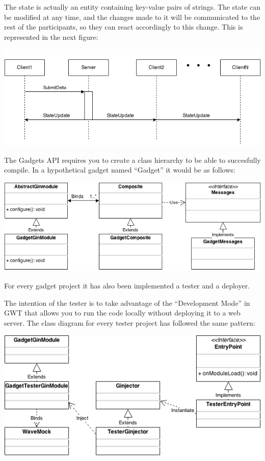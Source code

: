The state is actually an entity containing key-value pairs of strings. The state can be modified at any time, and the changes made to it will be communicated to the rest of the participants, so they can react accordingly to this change. This is represented in the next figure:


\begin{center}
\includegraphics[keepaspectratio, scale=0.6]{Media/Diagrams/Wave/StateSequence.png}
\end{center}


The Gadgets API requires you to create a class hierarchy to be able to succesfully compile. In a hypothetical gadget named ``Gadget'' it would be as follows:

\begin{center}
\includegraphics[keepaspectratio, scale=0.5]{Media/Diagrams/Gadget/Gadget.png}
\end{center}

For every gadget project it has also been implemented a tester and a deployer.

The intention of the tester is to take advantage of the ``Development Mode'' in GWT that allows you to run the code locally without deploying it to a web server. The class diagram for every tester project has followed the same pattern:

\begin{center}
\includegraphics[keepaspectratio, scale=0.6]{Media/Diagrams/Gadget/Tester.png}
\end{center}

